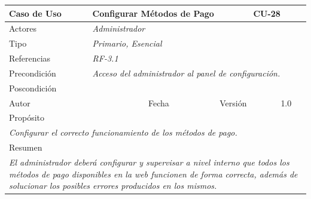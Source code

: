 \begin{table}[H]
    \begin{tabular}{|llllllll|}
    \hline
    \multicolumn{1}{|l|}{Caso de Uso}       & \multicolumn{5}{l|}{Configurar Métodos de Pago}                                                                          & \multicolumn{2}{l|}{\cellcolor[HTML]{E6E6E6}CU-28}          \\ \hline
    \multicolumn{1}{|l|}{Actores}           & \multicolumn{7}{l|}{{\color[HTML]{808080} \textit{Administrador}}}                                                                                                                           \\ \hline
    \multicolumn{1}{|l|}{Tipo}              & \multicolumn{7}{l|}{{\color[HTML]{808080} \textit{Primario, Esencial}}}                                                                                                                \\ \hline
    \multicolumn{1}{|l|}{Referencias}       & \multicolumn{2}{l|}{{\color[HTML]{808080} \textit{RF-3.1}}}              & \multicolumn{5}{l|}{}                                                                                       \\ \hline
    \multicolumn{1}{|l|}{Precondición}      & \multicolumn{7}{l|}{{\color[HTML]{808080} \textit{Acceso del administrador al panel de configuración.}}}                                                                                                \\ \hline
    \multicolumn{1}{|l|}{Poscondición}      & \multicolumn{7}{l|}{}                                                                                                                                                                  \\ \hline
    \multicolumn{1}{|l|}{Autor}             & \multicolumn{1}{l|}{}                        & \multicolumn{2}{l|}{Fecha}           & \multicolumn{1}{l|}{}     & \multicolumn{2}{l|}{Versión}         & 1.0                           \\ \hline
    \multicolumn{8}{|l|}{\cellcolor[HTML]{F2F2F2}Propósito}                                                                                                                                                                          \\ \hline
    \multicolumn{8}{|p{15cm}|}{{\color[HTML]{808080} \textit{Configurar el correcto funcionamiento de los métodos de pago.}}}                                                                                                           \\ \hline
    \multicolumn{8}{|l|}{\cellcolor[HTML]{F2F2F2}Resumen}                                                                                                                                                                            \\ \hline
    \multicolumn{8}{|p{15cm}|}{{\color[HTML]{808080} \textit{El administrador deberá configurar y supervisar a nivel interno que todos los métodos de pago disponibles en la web funcionen de forma correcta, además de solucionar los posibles errores producidos en los mismos.}}} \\ \hline
    \end{tabular}
\end{table}
